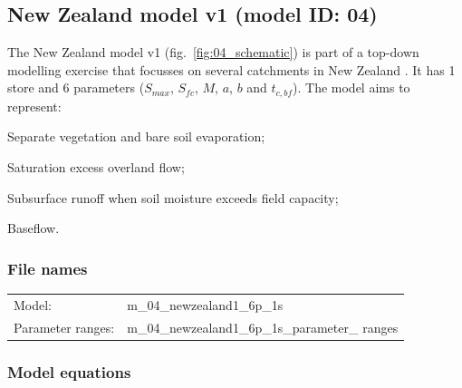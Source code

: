 \subsection{New Zealand model v1 (model ID: 04)}
The New Zealand model v1 (fig.~\ref{fig:04_schematic}) is part of a top-down modelling exercise that focusses on several catchments in New Zealand \citep{Atkinson2002}. It has 1 store and 6 parameters ($S_{max}$, $S_{fc}$, $M$, $a$, $b$ and $t_{c,bf}$). The model aims to represent:

\begin{itemizecompact}
\item Separate vegetation and bare soil evaporation;
\item Saturation excess overland flow;
\item Subsurface runoff when soil moisture exceeds field capacity;
\item Baseflow.
\end{itemizecompact}

\subsubsection{File names}
\begin{tabular}{@{}ll}
Model: &m\_04\_newzealand1\_6p\_1s \\
Parameter ranges: &m\_04\_newzealand1\_6p\_1s\_parameter\_ ranges \\
\end{tabular}

\subsubsection{Model equations}

